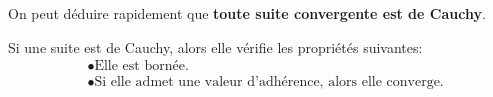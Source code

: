 On peut déduire rapidement que \textbf{toute suite convergente est de Cauchy}.\<

Si une suite est de Cauchy, alors elle vérifie les propriétés suivantes:
\begin{align*}
    &\bullet \text{Elle est bornée.} \\
    &\bullet \text{Si elle admet une valeur d'adhérence, alors elle converge.}
\end{align*}


